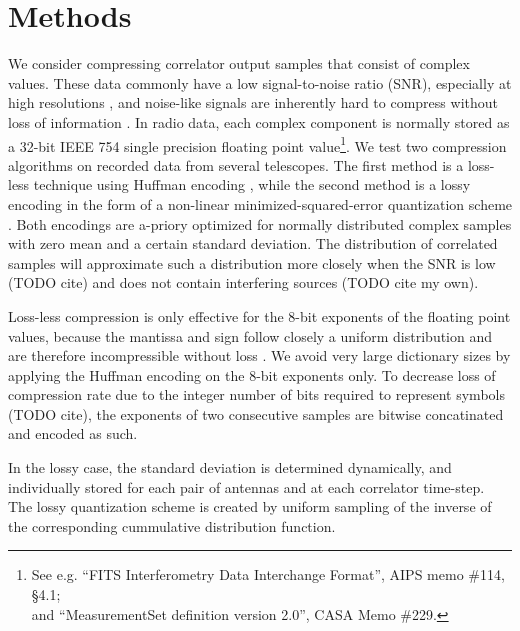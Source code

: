 \documentclass{article}
\begin{document}



\section{Methods}
We consider compressing correlator output samples that consist of complex values. These data commonly have a low signal-to-noise ratio (SNR), especially at high resolutions \cite{thompson-radio-interferometry}, and noise-like signals are inherently hard to compress without loss of information \cite{shannon-entropy-definition-1949}. In radio data, each complex component is normally stored as a 32-bit IEEE 754 single precision floating point value\footnote{See e.g. ``FITS Interferometry Data Interchange Format'', AIPS memo \#114, \S4.1;\\and ``MeasurementSet definition version 2.0'', CASA Memo \#229.}. We test two compression algorithms on recorded data from several telescopes. The first method is a loss-less technique using Huffman encoding \cite{huffman}, while the second method is a lossy encoding in the form of a non-linear minimized-squared-error quantization scheme \cite{least-squares-quantization-2006}. Both encodings are a-priory optimized for normally distributed complex samples with zero mean and a certain standard deviation. The distribution of correlated samples will approximate such a distribution more closely when the SNR is low (TODO cite) and does not contain interfering sources (TODO cite my own).

Loss-less compression is only effective for the 8-bit exponents of the floating point values, because the mantissa and sign follow closely a uniform distribution and are therefore incompressible without loss \cite{shannon-entropy-definition-1949}. We avoid very large dictionary sizes by applying the Huffman encoding on the 8-bit exponents only. To decrease loss of compression rate due to the integer number of bits required to represent symbols (TODO cite), the exponents of two consecutive samples are bitwise concatinated and encoded as such.

In the lossy case, the standard deviation is determined dynamically, and individually stored for each pair of antennas and at each correlator time-step. The lossy quantization scheme is created by uniform sampling of the inverse of the corresponding cummulative distribution function.
\end{document}

